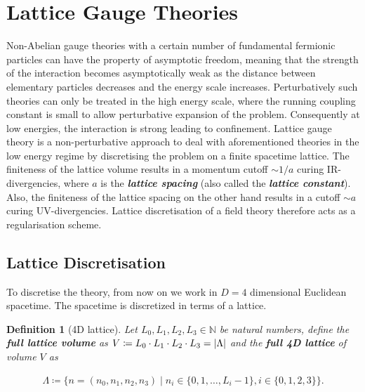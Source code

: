 \documentclass{article}
\theoremstyle{plain} %
\newtheorem{definition}{Definition}[section]
\theoremstyle{convention} %
\theoremstyle{remark} %
\def\df#1{\textbf{\textit{#1}}}
\numberwithin{equation}{section}
\begin{document}
\section{Lattice Gauge Theories}

\label{sec:lattice_gauge_theories}

Non-Abelian gauge theories with a certain number of fundamental fermionic particles can have the property of asymptotic freedom, meaning that the strength of the interaction becomes asymptotically weak as the distance between elementary particles decreases and the energy scale increases. Perturbatively such theories can only be treated in the high energy scale, where the running coupling constant is small to allow perturbative expansion of the problem. Consequently at low energies, the interaction is strong leading to confinement. Lattice gauge theory is a non-perturbative approach to deal with aforementioned theories in the low energy regime by discretising the problem on a finite spacetime lattice. The finiteness of the lattice volume results in a momentum cutoff $\sim 1/a$ curing IR-divergencies, where $a$ is the \df{lattice spacing} (also called the \df{lattice constant}). Also, the finiteness of the lattice spacing on the other hand results in a cutoff $\sim a$ curing UV-divergencies. Lattice discretisation of a field theory therefore acts as a regularisation scheme.

\subsection{Lattice Discretisation}

To discretise the theory, from now on we work in $D=4$ dimensional Euclidean spacetime. The spacetime is discretized in terms of a lattice.

\begin{definition}[4D lattice]

Let $L_0, L_1, L_2, L_3 \in \mathbb{N}$ be natural numbers, define the \df{full lattice volume} as $V \coloneqq L_0 \cdot L_1 \cdot L_2 \cdot L_3 = \abs{\Lambda}$ and the \df{full 4D lattice} of volume $V$ as

\begin{align*}
    \Lambda \coloneqq \{ n = (n_0, n_1, n_2, n_3) \mid n_i \in \{0, 1, \dots, L_i - 1 \}, i \in \{0,1,2,3\} \}.
\end{align*}

\end{definition}
\end{document}
